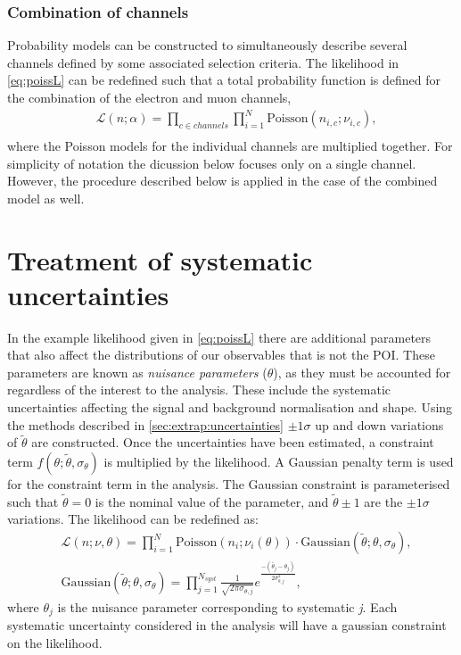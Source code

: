 \subsubsection{Combination of channels}
Probability models can be constructed to simultaneously describe several channels defined by some associated selection criteria. The likelihood in \cref{eq:poissL} can be redefined such that a total probability function is defined for the combination of the electron and muon channels, 
\begin{equation}
    \label{eq:poissLcomb}
    \begin{aligned}
        & \mathcal{L}(n;\alpha) = \prod_{c \in channels}\prod_{i=1}^{N}\mathrm{Poisson}(n_{i,c};\nu_{i,c}), \\
    \end{aligned}
\end{equation}
where the Poisson models for the individual channels are multiplied together. For simplicity of notation the dicussion below focuses only on a single channel. However, the procedure described below is applied in the case of the combined model as well. 

\section{Treatment of systematic uncertainties}\label{sec:stats:nps}
In the example likelihood given in \cref{eq:poissL} there are additional parameters that also affect the distributions of our observables that is not the POI. These parameters are known as \emph{nuisance parameters} ($\theta$), as they must be accounted for regardless of the interest to the analysis. These include the systematic uncertainties affecting the signal and background normalisation and shape. Using the methods described in \cref{sec:extrap:uncertainties} $\pm  1\sigma$ up and down variations of $\tilde{\theta}$ are constructed. Once the uncertainties have been estimated, a constraint term $f(\theta;\tilde{\theta},\sigma_\theta)$ is multiplied by the likelihood. A Gaussian penalty term is used for the constraint term in the analysis. The Gaussian constraint is parameterised such that $\tilde{\theta} = 0$ is the nominal value of the parameter, and $\tilde{\theta} \pm 1$ are the $\pm1\sigma$ variations. The likelihood can be redefined as:
\begin{equation}
    \label{eq:likelihood}
    \begin{aligned}
        & \mathcal{L}(n;\nu,\theta) = \prod_{i=1}^{N}\mathrm{Poisson}(n_i;\nu_i(\theta)) \cdot \mathrm{Gaussian}(\tilde{\theta};\theta,\sigma_\theta), \\
        & \mathrm{Gaussian}(\tilde{\theta};\theta,\sigma_\theta) = \prod_{j=1}^{N_{syst}} \frac{1}{\sqrt{2\pi\sigma_{\theta,j}}} e^\frac{-(\tilde{\theta_j} - \theta_j)}{2\sigma_{\theta,j}^2},
    \end{aligned}
\end{equation}
where $\theta_j$ is the nuisance parameter corresponding to systematic \emph{j}. Each systematic uncertainty considered in the analysis will have a gaussian constraint on the likelihood. 

